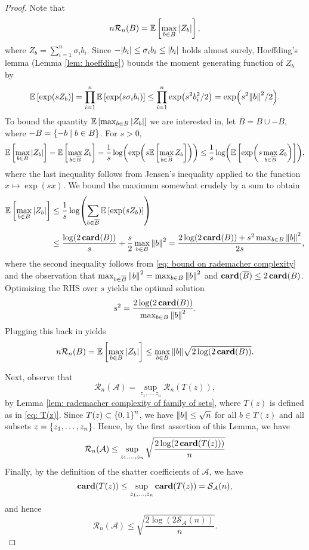 \begin{proof}
Note that
\[
    n \mathcal{R}_n(B) = \mathbb{E}\left[ \max_{b \in B} \abs{Z_b} \right],
\]
where $Z_b = \sum_{i=1}^n \sigma_i b_i$. Since $-\abs{b_i} \leq \sigma_i b_i \leq \abs{b_i}$ holds almost surely, Hoeffding's lemma (Lemma \ref{lem: hoeffding}) bounds the moment generating function of $Z_b$ by
\begin{equation}
\label{eq: bound on rademacher complexity}
    \mathbb{E}\left[\exp(s Z_b)\right] = \prod_{i=1}^n \mathbb{E}\left[\exp(s \sigma_i b_i)\right] \leq \prod_{i=1}^n \exp(s^2 b_i^2 / 2) = \exp(s^2 \norm{b}^2 / 2).
\end{equation}
To bound the quantity $\mathbb{E}\left[\max_{b \in B} \abs{Z_b}\right]$ we are interested in, let $\overline{B} = B \cup -B$, where $-B = \left\{-b \mathrel{|} b \in B\right\}$. For $s>0$,
\[
    \mathbb{E}\left[\max_{b \in B} \abs{Z_b}\right] = \mathbb{E}\left[\max_{b \in \overline{B}} Z_b\right] = \frac{1}{s} \log( \exp( s \mathbb{E}\left[\max_{b \in \overline{B}} Z_b\right] )) \leq \frac{1}{s} \log(\mathbb{E}\left[ \exp( s \max_{b \in \overline{B}} Z_b )\right] ),
\]
where the last inequality follows from Jensen's inequality applied to the function $x \mapsto \exp(sx)$. We bound the maximum somewhat crudely by a sum to obtain
\begin{align*}
    \mathbb{E}\left[\max_{b \in B} \abs{Z_b}\right] &\leq \frac{1}{s} \log( \sum_{b \in \overline{B}} \mathbb{E}\left[\exp(s Z_b)\right] ) \\[4pt]
        &\leq \frac{\log(2 \, \mathrm{\mathbf{card}}(B))}{s} + \frac{s}{2} \max_{b \in B} \norm{b}^2 = \frac{2 \log(2 \, \mathrm{\mathbf{card}}(B)) + s^2 \max_{b \in B} \norm{b}^2}{2s},
\end{align*}
where the second inequality follows from \eqref{eq: bound on rademacher complexity} and the observation that $\max_{b \in \overline{B}} \norm{b}^2 = \max_{b \in B} \norm{b}^2$ and $\mathrm{\mathbf{card}}(\overline{B}) \leq 2 \, \mathrm{\mathbf{card}}(B)$. Optimizing the RHS over $s$ yields the optimal solution
\[
    s^2 = \frac{2 \log(2 \, \mathrm{\mathbf{card}}(B))}{\max_{b \in B} \norm{b}^2}.
\]
Plugging this back in yields
\[
    n \mathcal{R}_n(B) = \mathbb{E}\left[ \max_{b \in B} \abs{Z_b} \right] \leq \max_{b \in B} \norm{b} \sqrt{2 \log(2 \, \mathrm{\mathbf{card}}(B))}.
\]

Next, observe that
\[
    \mathcal{R}_n(\mathcal{A}) = \sup_{z_1, \dots, z_n} \mathcal{R}_n(T(z)),
\]
by Lemma \ref{lem: rademacher complexity of family of sets}, where $T(z)$ is defined as in \eqref{eq: T(z)}. Since $T(z) \subset \left\{0, 1\right\}^n$, we have $\norm{b} \leq \sqrt{n}$ for all $b \in T(z)$ and all subsets $z = \left\{z_1, \dots, z_n\right\}$. Hence, by the first assertion of this Lemma, we have
\[
    \mathcal{R}_n(\mathcal{A}) \leq \sup_{z_1, \dots, z_n} \sqrt{\frac{2 \log(2 \, \mathrm{\mathbf{card}}(T(z)))}{n}}
\]
Finally, by the definition of the shatter coefficients of $\mathcal{A}$, we have
\[
    \mathrm{\mathbf{card}}(T(z)) \leq \sup_{z_1, \dots, z_n} \mathrm{\mathbf{card}}(T(z)) = \mathcal{S}_{\mathcal{A}}(n),
\]
and hence
\[
    \mathcal{R}_n(\mathcal{A}) \leq \sqrt{ \frac{2 \log(2 \mathcal{S}_{\mathcal{A}}(n)) }{n} }.
\]
\end{proof}

